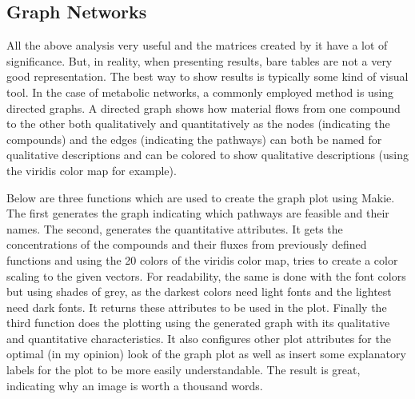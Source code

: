 \documentclass[11pt]{article}
\begin{document}
\subsection{Graph Networks}
\label{sec:org57235a1}
All the above analysis very useful and the matrices created by it have a lot of significance. But, in reality, when presenting results, bare tables are not a very good representation. The best way to show results is typically some kind of visual tool. In the case of metabolic networks, a commonly employed method is using directed graphs. A directed graph shows how material flows from one compound to the other both qualitatively and quantitatively as the nodes (indicating the compounds) and the edges (indicating the pathways) can both be named for qualitative descriptions and can be colored to show qualitative descriptions (using the viridis color map for example).

Below are three functions which are used to create the graph plot using Makie. The first generates the graph indicating which pathways are feasible and their names. The second, generates the quantitative attributes. It gets the concentrations of the compounds and their fluxes from previously defined functions and using the 20 colors of the viridis color map, tries to create a color scaling to the given vectors. For readability, the same is done with the font colors but using shades of grey, as the darkest colors need light fonts and the lightest need dark fonts. It returns these attributes to be used in the plot. Finally the third function does the plotting using the generated graph with its qualitative and quantitative characteristics. It also configures other plot attributes for the optimal (in my opinion) look of the graph plot as well as insert some explanatory labels for the plot to be more easily understandable. The result is great, indicating why an image is worth a thousand words.
\end{document}
